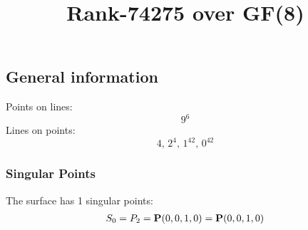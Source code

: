 \documentclass{article}
\newcommand\setTBstruts{\def\T{\rule{0pt}{2.6ex}}%
\def\B{\rule[-1.2ex]{0pt}{0pt}}}
\newcommand{\bP}{{\bf P}}
\begin{document}
 
\setTBstruts



{\allowdisplaybreaks%






\title{Rank-74275 over GF(8)}
\author{}%
\maketitle%
%
{}



\subsection*{General information}
Points on lines:
$$
9^6$$
Lines on points:
$$
4,\,2^4,\,1^{42},\,0^{42}$$
\subsubsection*{Singular Points}
The surface has 1 singular points:\\
\begin{align*}
S_{0} &= P_{2}=\bP(0, 0, 1, 0) = \bP(0, 0, 1, 0)\\
\end{align*}
}
\end{document}
